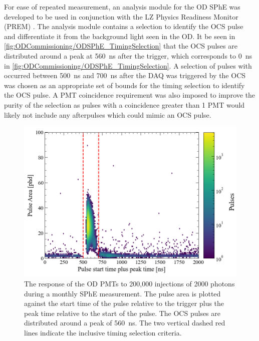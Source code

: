 For ease of repeated measurement, an analysis module for the OD SPhE was developed to be used in conjunction with the LZ Physics Readiness Monitor (PREM) \cite{LZTDR}. The analysis module contains a selection to identify the OCS pulse and differentiate it from the background light seen in the OD. It be seen in \autoref{fig:ODCommissioning/ODSPhE_TimingSelection} that the OCS pulses are distributed around a peak at 560~ns after the trigger, which corresponds to 0~ns in \autoref{fig:ODCommissioning/ODSPhE_TimingSelection}. A selection of pulses with occurred between 500~ns and 700~ns after the DAQ was triggered by the OCS was chosen as an appropriate set of bounds for the timing selection to identify the OCS pulse. A PMT coincidence requirement was also imposed to improve the purity of the selection as pulses with a coincidence greater than 1 PMT would likely not include any afterpulses which could mimic an OCS pulse.

\begin{figure}[ht!]
    \centering
    \includegraphics[width=0.7\linewidth]{figures/ODCommissioning/TimingVsPulseArea_2us.png}
    \caption{The response of the OD PMTs to 200,000 injections of 2000 photons during a monthly SPhE measurement. The pulse area is plotted against the start time of the pulse relative to the trigger plus the peak time relative to the start of the pulse. The OCS pulses are distributed around a peak of 560~ns. The two vertical dashed red lines indicate the inclusive timing selection criteria.}
    \label{fig:ODCommissioning/ODSPhE_TimingSelection}
\end{figure}


